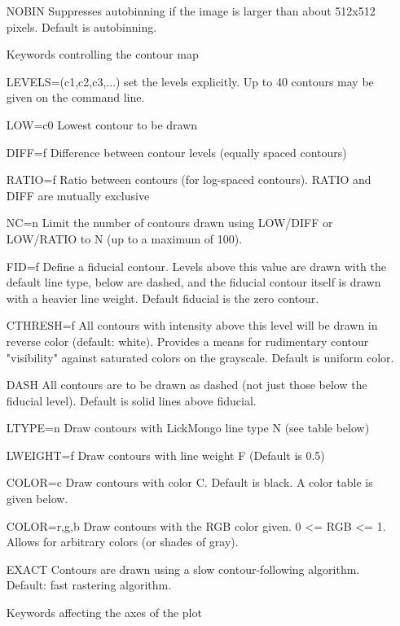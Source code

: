 \begin{itemize}
  \item[NOBIN]{Suppresses autobinning if the image is larger than about
               512x512 pixels.  Default is autobinning.}
  \item[Keywords controlling the contour map \hfill]{}
  \item[LEVELS=(c1,c2,c3,...)]{set the levels explicitly.  Up to 40 contours 
       may be given on the command line.}
  \item[LOW=c0]{Lowest contour to be drawn}
  \item[DIFF=f]{Difference between contour levels (equally spaced contours)}
  \item[RATIO=f]{Ratio between contours (for log-spaced contours).  RATIO
                 and DIFF are mutually exclusive}
  \item[NC=n]{Limit the number of contours drawn using LOW/DIFF or 
                  LOW/RATIO to N (up to a maximum of 100).}
  \item[FID=f]{Define a fiducial contour.  Levels above this value are
                  drawn with the default line type, below are dashed, and
                  the fiducial contour itself is drawn with a heavier
                  line weight.  Default fiducial is the zero contour.}
  \item[CTHRESH=f]{All contours with intensity above this level will be
                  drawn in reverse color (default: white).  Provides a means
                  for rudimentary contour "visibility" against saturated
                  colors on the grayscale.  Default is uniform color.}
  \item[DASH]{All contours are to be drawn as dashed (not just those below
              the fiducial level).  Default is solid lines above fiducial.}
  \item[LTYPE=n ]{Draw contours with LickMongo line type N (see table below)}
  \item[LWEIGHT=f]{Draw contours with line weight F (Default is 0.5)}
  \item[COLOR=c]{Draw contours with color C.  Default is black.  A color table 
                 is given below.}
  \item[COLOR=r,g,b]{ Draw contours with the RGB color given.  0 <= RGB <= 1.  
               Allows for arbitrary colors (or shades of gray).}
  \item[EXACT]{Contours are drawn using a slow contour-following algorithm.
               Default: fast rastering algorithm.}
  \item[Keywords affecting the axes of the plot\hfill]{}

\end{itemize}

